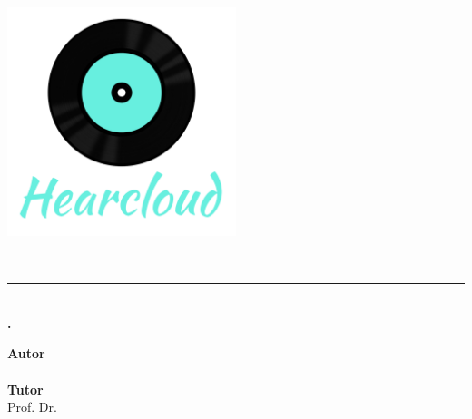 \begin{titlepage}
 
 
\setlength{\centeroffset}{-0.5\oddsidemargin}
\addtolength{\centeroffset}{0.5\evensidemargin}
\thispagestyle{empty}

\noindent\hspace*{\centeroffset}\begin{minipage}{\textwidth}

\centering

\vspace{3.3cm}

\includegraphics[width=0.5\textwidth]{../images/logo_hearcloud_full.png}

 \vspace{0.5cm}


{\Huge\bfseries \myTitle\\
}
\noindent\rule[-1ex]{\textwidth}{3pt}\\[3.5ex]
{\large\bfseries \mySubTitle.\\[4cm]}
\end{minipage}

\vspace{2.5cm}
\noindent\hspace*{\centeroffset}\begin{minipage}{\textwidth}
\centering

\textbf{Autor}\\ {\myName}\\[2.5ex]
\textbf{Tutor}\\ {Prof. Dr. \myProf}\\[2cm]

\end{minipage}

 
\end{titlepage}


